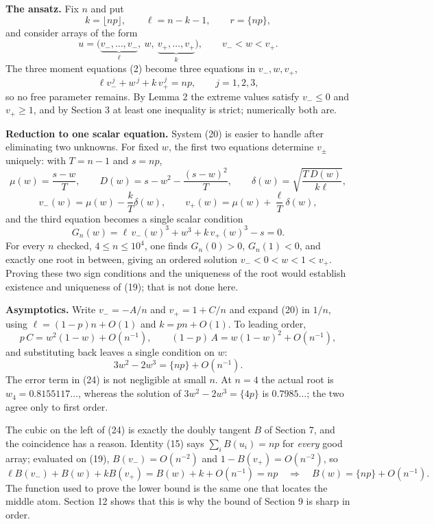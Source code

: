 \documentclass[12pt]{article}
\begin{document}
\textbf{The ansatz.} Fix \(n\) and put
\[
k=\lfloor np\rfloor,\qquad \ell=n-k-1,\qquad r=\{np\},
\]
and consider arrays of the form
\[
u=\bigl(\underbrace{v_-,\dots,v_-}_{\ell},\ w,\ \underbrace{v_+,\dots,v_+}_{k}\bigr),
\qquad v_-<w<v_+ .
\tag{19}
\]
The three moment equations (2) become three equations in \(v_-,w,v_+\),
\[
\ell v_-^{\,j}+w^{\,j}+k\,v_+^{\,j}=np,\qquad j=1,2,3,
\tag{20}
\]
so no free parameter remains. By Lemma 2 the extreme values satisfy
\(v_-\le0\) and \(v_+\ge1\), and by Section 3 at least one inequality is
strict; numerically both are.

\textbf{Reduction to one scalar equation.} System (20) is easier to
handle after eliminating two unknowns. For fixed \(w\), the first two
equations determine \(v_\pm\) uniquely: with \(T=n-1\) and \(s=np\),
\[
\mu(w)=\frac{s-w}{T},
\qquad
D(w)=s-w^2-\frac{(s-w)^2}{T},
\qquad
\delta(w)=\sqrt{\frac{T\,D(w)}{k\ell}},
\]
\[
v_-(w)=\mu(w)-\frac kT\delta(w),
\qquad
v_+(w)=\mu(w)+\frac \ell T\delta(w),
\tag{21}
\]
and the third equation becomes a single scalar condition
\[
G_n(w)=\ell\,v_-(w)^3+w^3+k\,v_+(w)^3-s=0 .
\tag{22}
\]
For every \(n\) checked, \(4\le n\le10^4\), one finds \(G_n(0)>0\),
\(G_n(1)<0\), and exactly one root in between, giving an ordered solution
\(v_-<0<w<1<v_+\). Proving these two sign conditions and the uniqueness
of the root would establish existence and uniqueness of (19); that is not
done here.

\textbf{Asymptotics.} Write \(v_-=-A/n\) and \(v_+=1+C/n\) and expand
(20) in \(1/n\), using \(\ell=(1-p)n+O(1)\) and \(k=pn+O(1)\). To leading
order,
\[
p\,C=w^2(1-w)+O(n^{-1}),
\qquad
(1-p)\,A=w(1-w)^2+O(n^{-1}),
\tag{23}
\]
and substituting back leaves a single condition on \(w\):
\[
\boxed{\displaystyle 3w^2-2w^3=\{np\}+O(n^{-1}).}
\tag{24}
\]
The error term in (24) is not negligible at small \(n\). At \(n=4\) the
actual root is \(w_4=0.8155117\ldots\), whereas the solution of
\(3w^2-2w^3=\{4p\}\) is \(0.7985\ldots\); the two agree only to first
order.

The cubic on the left of (24) is exactly the doubly tangent \(B\) of
Section 7, and the coincidence has a reason. Identity (15) says \(\sum_iB(u_i)=np\) for \emph{every} good array; evaluated on (19),
\(B(v_-)=O(n^{-2})\) and \(1-B(v_+)=O(n^{-2})\), so
\[
\ell B(v_-)+B(w)+kB(v_+)=B(w)+k+O(n^{-1})=np
\quad\Longrightarrow\quad
B(w)=\{np\}+O(n^{-1}).
\]
The function used to prove the lower bound is the same one that locates
the middle atom. Section 12 shows that this is why the bound of Section 9
is sharp in order.
\end{document}
